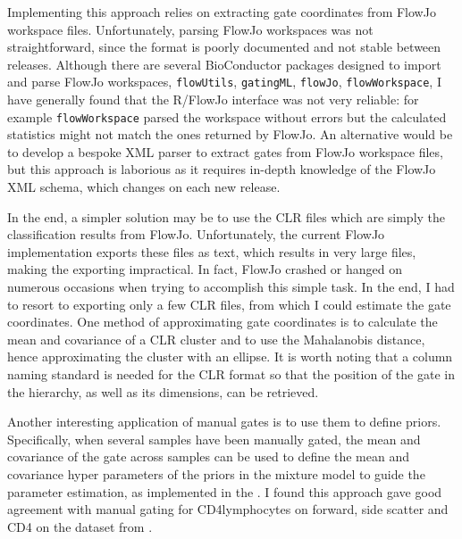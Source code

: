 Implementing this approach relies on extracting gate coordinates from FlowJo workspace files.
Unfortunately, parsing FlowJo workspaces was not straightforward, since the format is poorly documented and not stable between releases.
Although there are several BioConductor packages designed to import and parse FlowJo workspaces, \texttt{flowUtils}, \texttt{gatingML}, \texttt{flowJo}, \texttt{flowWorkspace}, I have generally found that the R/FlowJo interface was not very reliable: for example \texttt{flowWorkspace} parsed the workspace without errors but the calculated statistics might not match the ones returned by FlowJo.
An alternative would be to develop a bespoke XML parser to extract gates from FlowJo workspace files, but this approach is laborious as it requires in-depth knowledge of the FlowJo XML schema, which changes on each new release.

In the end, a simpler solution may be to use the CLR files which are simply the classification results from FlowJo.
Unfortunately, the current FlowJo implementation exports these files as text, which results in very large files, making the exporting impractical. 
In fact, FlowJo crashed or hanged on numerous occasions when trying to accomplish this simple task.
In the end, I had to resort to exporting only a few CLR files, from which I could estimate the gate coordinates.
One method of approximating gate coordinates is to calculate the mean and covariance of a CLR cluster and to use the Mahalanobis distance, hence approximating the cluster with an ellipse.
It is worth noting that a column naming standard is needed for the CLR format so that the position of the gate in the hierarchy, as well as its dimensions, can be retrieved.

Another interesting application of manual gates is to use them to define priors.
Specifically, when several samples have been manually gated, the mean and covariance of the gate across samples can be used to define the mean and covariance hyper parameters of the priors in the mixture model to guide the parameter estimation, as implemented in the .
I found this approach gave good agreement with manual gating for CD4\positive lymphocytes on forward, side scatter and CD4 on the dataset from .

